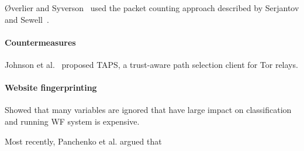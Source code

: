 \O{}verlier and Syverson~\cite{Overlier2006a} used the packet counting approach
described by Serjantov and Sewell~\cite{Serjantov2003a}.

\cite{Goldberg2010a}

\cite{Juen2015a}

\paragraph{Countermeasures}
\cite{Edman2009a}
\cite{Nithyanand2016a}
\cite{Akhoondi2012a}


\cite{Mathewson2004a}
\cite{Mittal2011a}
\cite{Wacek2013a}
\cite{Johnson2013a}
\cite{Juen2015a}
\cite{Danezis2004a}
\cite{Levine2004a}
\cite{Bauer2007a}
\cite{Dingledine2009a}


Johnson et al.~\cite{Johnson2015a} proposed TAPS, a trust-aware path selection
client for Tor relays.

\cite{torstinks}

\paragraph{Website fingerprinting}
\cite{Juarez2014a}
Showed that many variables are ignored that have large impact on classification
and running WF system is expensive.

Most recently, Panchenko et al. argued that 
\cite{Panchenko2016a}
